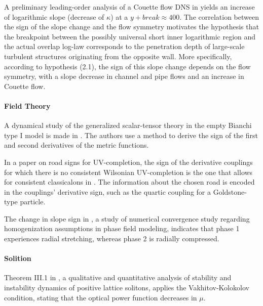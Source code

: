 \documentclass[11pt]{book}
\begin{document}
A preliminary leading-order analysis of a Couette flow DNS in \cite{monkewitz2021late}
yields an increase of logarithmic slope (decrease of $\kappa$) at
a $y+break\approx400$. The correlation between the sign of the slope
change and the flow symmetry motivates the hypothesis that the breakpoint
between the possibly universal short inner logarithmic region and
the actual overlap log-law corresponds to the penetration depth of
large-scale turbulent structures originating from the opposite wall.
More specifically, according to hypothesis (2.1), the sign of this
slope change depends on the flow symmetry, with a slope decrease in
channel and pipe flows and an increase in Couette flow.


\paragraph{Field Theory}

A dynamical study of the generalized scalar-tensor theory in the empty
Bianchi type I model is made in \cite{fay2000dynamical}. The authors
use a method to derive the sign of the first and second derivatives
of the metric functions.

In a paper on road signs for UV-completion, the sign of the derivative couplings for which there is no consistent
Wilsonian UV-completion is the one that allows for consistent classicalons
in \cite{dvali2012road}. The information about the chosen road is
encoded in the couplings' derivative sign, such as the quartic coupling
for a Goldstone-type particle.

The change in slope sign in \cite{kiefer2017numerical}, a study of numerical convergence study regarding homogenization
assumptions in phase field modeling, indicates
that phase 1 experiences radial stretching, whereas phase 2 is radially
compressed.


\paragraph{Solition}

Theorem III.1 in \cite{sivan2008qualitative}, a qualitative and quantitative analysis of stability and instability dynamics
of positive lattice solitons, applies the Vakhitov-Kolokolov
condition, stating that the optical power function decreases in $\mu$.
\end{document}
